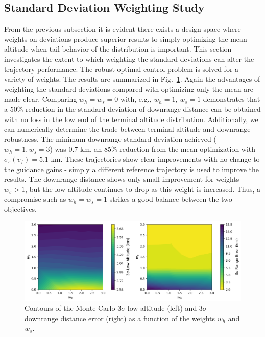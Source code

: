 \documentclass[journal ]{new-aiaa}
\begin{document}
\subsection*{Standard Deviation Weighting Study}
From the previous subsection it is evident there exists a design space where weights on deviations produce superior results to simply optimizing the mean altitude when tail behavior of the distribution is important. This section investigates the extent to which weighting the standard deviations can alter the trajectory performance. The robust optimal control problem is solved for a variety of weights. The results are summarized in Fig.~\ref{fig_weight_sweep}. Again the advantages of weighting the standard deviations compared with optimizing only the mean are made clear. Comparing $w_h=w_s=0$ with, e.g., $w_h=1,\,w_s = 1$ demonstrates that a 50\% reduction in the standard deviation of downrange distance can be obtained with no loss in the low end of the terminal altitude distribution. Additionally, we can numerically determine the trade between terminal altitude and downrange robustness. The minimum downrange standard deviation achieved ($w_h=1,w_s=3$) was 0.7 km, an 85\% reduction from the mean optimization with $\sigma_s(v_f)=5.1$ km. These trajectories show clear improvements with no change to the guidance gains - simply a different reference trajectory is used to improve the results. The downrange distance shows only small improvement for weights $w_s>1$, but the low altitude continues to drop as this weight is increased. Thus, a compromise such as $w_h=w_s=1$ strikes a good balance between the two objectives. 
\begin{figure}[h!]
	\centering
	\includegraphics[width=1\textwidth]{ddp/python/Heavy_WeightSweepMCResults}
	\caption{Contours of the Monte Carlo 3$\sigma$ low altitude (left) and 3$\sigma$ downrange distance error (right) as a function of the weights $w_h$ and $w_s$.}
	\label{fig_weight_sweep}
\end{figure}
\end{document}
